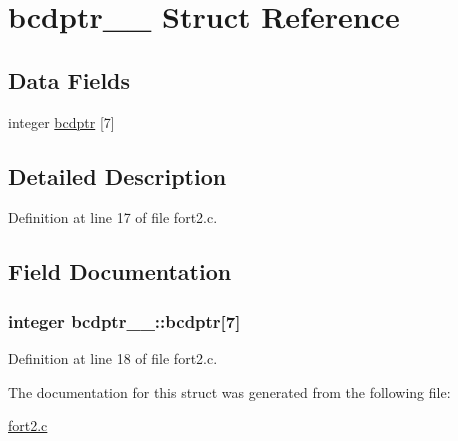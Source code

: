 \hypertarget{structbcdptr__1__}{}\section{bcdptr\+\_\+\_\+ Struct Reference}
\label{structbcdptr__1__}
\subsection*{Data Fields}
\begin{DoxyCompactItemize}
\item 
integer \hyperlink{structbcdptr__1___aad2d014c8d96a927b689b94f8ccbac3d}{bcdptr} \mbox{[}7\mbox{]}
\end{DoxyCompactItemize}


\subsection{Detailed Description}


Definition at line 17 of file fort2.\+c.



\subsection{Field Documentation}
\subsubsection[{\texorpdfstring{bcdptr}{bcdptr}}]{\setlength{\rightskip}{0pt plus 5cm}integer bcdptr\+\_\+\_\+\+::bcdptr\mbox{[}7\mbox{]}}\hypertarget{structbcdptr__1___aad2d014c8d96a927b689b94f8ccbac3d}{}\label{structbcdptr__1___aad2d014c8d96a927b689b94f8ccbac3d}


Definition at line 18 of file fort2.\+c.



The documentation for this struct was generated from the following file\+:\begin{DoxyCompactItemize}
\item 
\hyperlink{fort2_8c}{fort2.\+c}\end{DoxyCompactItemize}

